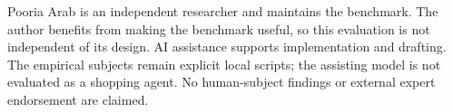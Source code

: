 \documentclass{article}
\begin{document}
Pooria Arab is an independent researcher and maintains the benchmark. The author benefits from making the benchmark useful, so this evaluation is not independent of its design. AI assistance supports implementation and drafting. The empirical subjects remain explicit local scripts; the assisting model is not evaluated as a shopping agent. No human-subject findings or external expert endorsement are claimed.


\end{document}
